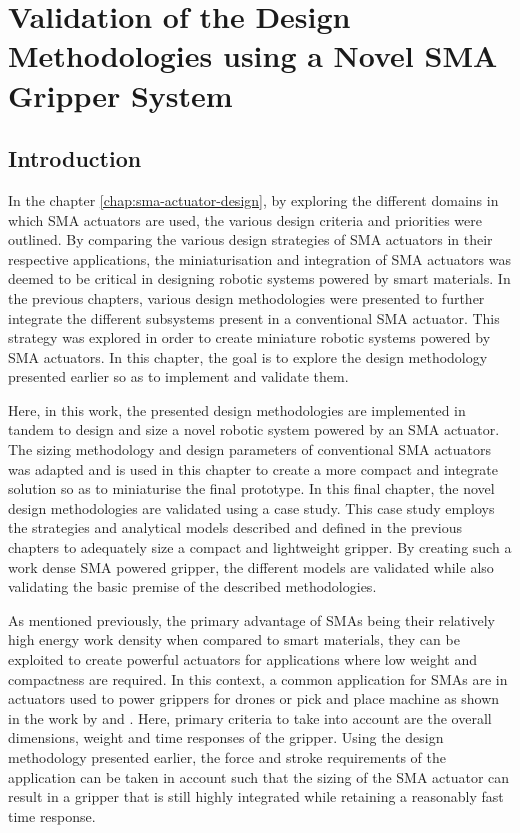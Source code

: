 
\chapter{Validation of the Design Methodologies using a Novel SMA Gripper System}\label{chap:case-study}
\section{Introduction}
In the chapter \cref{chap:sma-actuator-design}, by exploring the different domains in which SMA actuators are used, the various design criteria and priorities were outlined. By comparing the various design strategies of SMA actuators in their respective applications, the miniaturisation and integration of SMA actuators was deemed to be critical in designing robotic systems powered by smart materials. In the previous chapters, various design methodologies were presented to further integrate the different subsystems present in a conventional SMA actuator. This strategy was explored in order to create miniature robotic systems powered by SMA actuators. In this chapter, the goal is to explore the design methodology presented earlier so as to implement and validate them.

Here, in this work, the presented design methodologies are implemented in tandem to design and size a novel robotic system powered by an SMA actuator. The sizing methodology and design parameters of conventional SMA actuators was adapted and is used in this chapter to create a more compact and integrate solution so as to miniaturise the final prototype. In this final chapter, the novel design methodologies are validated using a case study. This case study employs the strategies and analytical models described and defined in the previous chapters to adequately size a compact and lightweight gripper. By creating such a work dense SMA powered gripper, the different models are validated while also validating the basic premise of the described methodologies.

As mentioned previously, the primary advantage of SMAs being their relatively high energy work density when compared to smart materials, they can be exploited to create powerful actuators for applications where low weight and compactness are required. In this context, a common application for SMAs are in actuators used to power grippers for drones or pick and place machine as shown in the work by \todocite and \todocite. Here, primary criteria to take into account are the overall dimensions, weight and time responses of the gripper. Using the design methodology presented earlier, the force and stroke requirements of the application can be taken in account such that the sizing of the SMA actuator can result in a gripper that is still highly integrated while retaining a reasonably fast time response.

